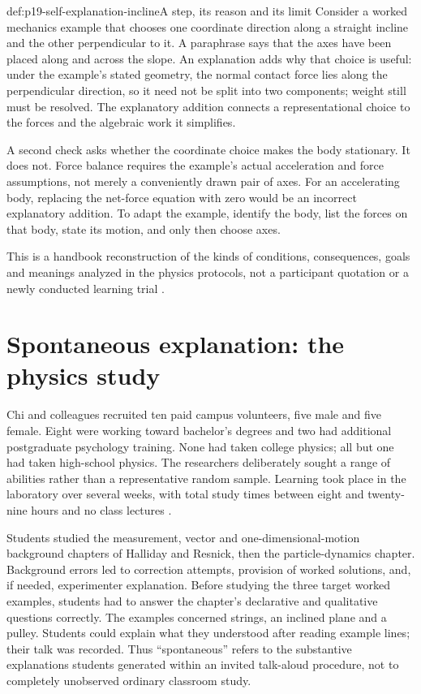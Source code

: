 \begin{hbexample}{def:p19-self-explanation-incline}{A step, its reason and its limit}
Consider a worked mechanics example that chooses one coordinate direction
along a straight incline and the other perpendicular to it. A paraphrase
says that the axes have been placed along and across the slope. An
explanation adds why that choice is useful: under the example's stated
geometry, the normal contact force lies along the perpendicular direction,
so it need not be split into two components; weight still must be resolved.
The explanatory addition connects a representational choice to the forces
and the algebraic work it simplifies.

A second check asks whether the coordinate choice makes the body stationary.
It does not. Force balance requires the example's actual acceleration and
force assumptions, not merely a conveniently drawn pair of axes. For an
accelerating body, replacing the net-force equation with zero would be an
incorrect explanatory addition. To adapt the example, identify the body,
list the forces on that body, state its motion, and only then choose axes.

This is a handbook reconstruction of the kinds of conditions, consequences,
goals and meanings analyzed in the physics protocols, not a participant
quotation or a newly conducted learning trial
\cite[pp.~164--168]{ChiEtAl1989SelfExplanations}.
\end{hbexample}

\section{Spontaneous explanation: the physics study}
\label{sec:p19-self-explanation-physics}

Chi and colleagues recruited ten paid campus volunteers, five male and five
female. Eight were working toward bachelor's degrees and two had additional
postgraduate psychology training. None had taken college physics; all but
one had taken high-school physics. The researchers deliberately sought a
range of abilities rather than a representative random sample. Learning
took place in the laboratory over several weeks, with total study times
between eight and twenty-nine hours and no class lectures
\cite[pp.~151--154]{ChiEtAl1989SelfExplanations}.

Students studied the measurement, vector and one-dimensional-motion
background chapters of Halliday and Resnick, then the particle-dynamics
chapter. Background errors led to correction attempts, provision of worked
solutions, and, if needed, experimenter explanation. Before studying the
three target worked examples, students had to answer the chapter's
declarative and qualitative questions correctly. The examples concerned
strings, an inclined plane and a pulley. Students could explain what they
understood after reading example lines; their talk was recorded. Thus
``spontaneous'' refers to the substantive explanations students generated
within an invited talk-aloud procedure, not to completely unobserved
ordinary classroom study.

